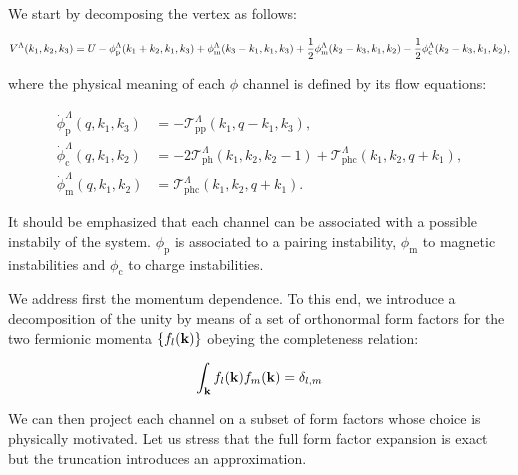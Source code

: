 %
%
%


We start by decomposing the vertex as follows:

\begin{widetext}
\begin{align}
V^{\Lambda}(k_1,k_2,k_3) = U - \phi^{\Lambda}_{\mathrm{p}}(k_1+k_2,k_1,k_3) + \phi^{\Lambda}_{\mathrm{m}}(k_3-k_1,k_1,k_3)
 + \frac{1}{2}  \phi^{\Lambda}_{\mathrm{m}}(k_2- k_3,k_1,k_2) - \frac{1}{2} \phi^{\Lambda}_{\mathrm{c}}(k_2-k_3,k_1,k_2),
\end{align}
\end{widetext}

where the physical meaning of each $\phi$ channel is defined by its flow equations:

\begin{align}
\dot{\phi}_{\mathrm{p}}^{\Lambda}(q,k_1,k_3) &= -\mathcal{T}^{\Lambda}_{\mathrm{pp}}(k_1,q-k_1,k_3) , \\
\dot{\phi}_{\mathrm{c}}^{\Lambda}(q,k_1,k_2) &= -2\mathcal{T}^{\Lambda}_{\mathrm{ph}}(k_1,k_2,k_2-1) + \mathcal{T}^{\Lambda}_{\mathrm{phc}}(k_1,k_2,q+k_1) , \\
\dot{\phi}_{\mathrm{m}}^{\Lambda}(q,k_1,k_2) &= \mathcal{T}^{\Lambda}_{\mathrm{phc}}(k_1,k_2,q+k_1) .
\end{align}

It should be emphasized that each channel can be associated with a possible instabily of the 
system. $\phi_{\mathrm{p}}$ is associated to a pairing instability, $\phi_{\mathrm{m}}$ to magnetic 
instabilities and $\phi_{\mathrm{c}}$ to charge instabilities.

We address first the momentum dependence. To this end, we introduce a decomposition of the 
unity by means of a set of orthonormal form factors for the two fermionic momenta $\{f_{l}(\mathbf{k})\}$ obeying 
the completeness relation:

\begin{equation}
 \int_{\mathbf{k}}  f_{l}(\mathbf{k}) f_{m}(\mathbf{k}) = \delta_{l,m}
\end{equation}

We can then project each channel on a subset of form factors whose choice is physically motivated. 
Let us stress that the full form factor expansion is exact but the truncation introduces an approximation.

